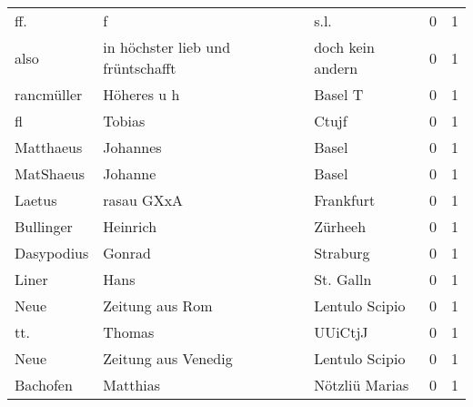 \begin{center}
\begin{tiny}
\begin{longtabu}{llllrr}
                      ff. &                                  f &             &                                        s.l. &          0 &         1 \\
                     also &  in höchster lieb und früntschafft &             &                            doch kein andern &          0 &         1 \\
               rancmüller &                        Höheres u h &             &                                     Basel T &          0 &         1 \\
                       fl &                             Tobias &             &                                       Ctujf &          0 &         1 \\
                Matthaeus &                           Johannes &             &                                       Basel &          0 &         1 \\
                MatShaeus &                            Johanne &             &                                       Basel &          0 &         1 \\
                   Laetus &                         rasau GXxA &             &                                   Frankfurt &          0 &         1 \\
                Bullinger &                           Heinrich &             &                                     Zürheeh &          0 &         1 \\
               Dasypodius &                             Gonrad &             &                                    Straburg &          0 &         1 \\
                    Liner &                               Hans &             &                                   St. Galln &          0 &         1 \\
                     Neue &                    Zeitung aus Rom &             &                              Lentulo Scipio &          0 &         1 \\
                      tt. &                             Thomas &             &                                     UUiCtjJ &          0 &         1 \\
                     Neue &                Zeitung aus Venedig &             &                              Lentulo Scipio &          0 &         1 \\
                 Bachofen &                           Matthias &             &                              Nötzliü Marias &          0 &         1 \\

\end{longtabu}
\end{tiny}
\end{center}
